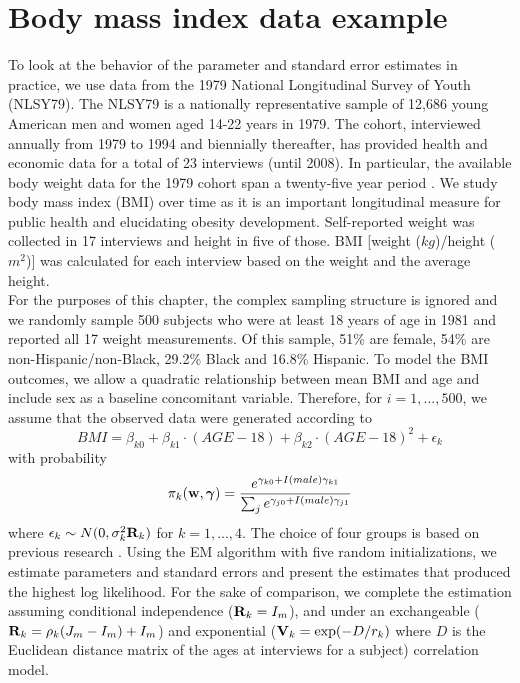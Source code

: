 \section{Body mass index data example}
To look at the behavior of the parameter and standard error estimates in practice, we use data from the 1979 National Longitudinal Survey of Youth (NLSY79). The NLSY79 is a nationally representative sample of 12,686 young American men and women aged 14-22 years in 1979. The cohort, interviewed annually from 1979 to 1994 and biennially thereafter, has provided health and economic data for a total of 23 interviews (until 2008).  In particular, the available body weight data for the 1979 cohort span a twenty-five year period \cite{ostbye2011}. We study body mass index (BMI) over time as it is an important longitudinal measure for public health and elucidating obesity development.  Self-reported weight was collected in 17 interviews and height in five of those. BMI [weight ($kg$)/height ($m^{2}$)] was calculated for each interview based on the weight and the average height.\\

For the purposes of this chapter, the complex sampling structure is ignored and we randomly sample 500 subjects who were at least 18 years of age in 1981 and reported all 17 weight measurements. Of this sample, 51\% are female, 54\% are non-Hispanic/non-Black, 29.2\% Black and 16.8\% Hispanic. To model the BMI outcomes, we allow a quadratic relationship between mean BMI and age and include sex as a baseline concomitant variable. Therefore, for $i=1,...,500$, we assume that the observed data were generated according to
$$BMI=\beta_{k0}+\beta_{k1}\cdot (AGE-18)+\beta_{k2}\cdot (AGE-18)^{2}+\epsilon_{k}$$
with probability
$$\pi_{k}(\mathbf w,\boldsymbol\gamma)=\frac{e^{\gamma_{k0}+I(male)\gamma_{k1}}}{\sum_{j}e^{\gamma_{j0}+I(male)\gamma_{j1}}}$$
where $\epsilon_{k}\sim N(0,\sigma_{k}^{2}\mathbf R_k)$
for $k=1,...,4$. The choice of four groups is based on previous research \cite{ostbye2011}. Using the EM algorithm with five random initializations, we estimate parameters and standard errors and present the estimates that produced the highest log likelihood. For the sake of comparison, we complete the estimation assuming conditional independence ($\mathbf R_k  = I_m$), and under an exchangeable ($\mathbf R_k = \rho_k(J_m - I_m)+I_m$) and exponential ($\mathbf V_k = \exp(-D/r_k)$ where $D$ is the Euclidean distance matrix of the ages at interviews for a subject) correlation model.
